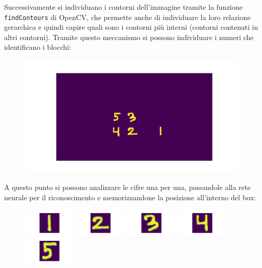 \documentclass{article}
\begin{document}
	\noindent Successivamente si individuano i contorni dell'immagine tramite la funzione \verb*|findContours| di OpenCV, che permette anche di individuare la loro relazione gerarchica e quindi capire quali sono i contorni più interni (contorni contenuti in altri contorni). Tramite questo meccanismo si possono individuare i numeri che identificano i blocchi:
	
	\begin{figure}[H]
		\centering
		\includegraphics[width=11cm]{./images/immagine_test_numeri.png}
	\end{figure}
	
	
	\noindent A questo punto si possono analizzare le cifre una per una, passandole alla rete neurale per il riconoscimento e memorizzandone la posizione all'interno del box:
	
	\begin{figure}[H]
		\centering
		\includegraphics[width=2.5cm]{./images/1.png}
		\includegraphics[width=2.5cm]{./images/2.png}
		\includegraphics[width=2.5cm]{./images/3.png}
		\includegraphics[width=2.5cm]{./images/4.png}
		\includegraphics[width=2.5cm]{./images/5.png}
	\end{figure}
\end{document}

